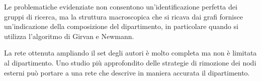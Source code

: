 \documentclass[12pt,a4paper,twoside]{report}
\begin{document}
Le problematiche evidenziate non consentono un'identificazione perfetta dei gruppi di ricerca, ma la
struttura macroscopica che si ricava dai grafi fornisce un'indicazione della composizione del
dipartimento, in particolare quando si utilizza l'algoritmo di Girvan e Newmann.

La rete ottenuta ampliando il set degli autori è molto completa ma non è limitata al dipartimento.
Uno studio più approfondito delle strategie di rimozione dei nodi esterni può portare a una rete che
descrive in maniera accurata il dipartimento.








\end{document}
